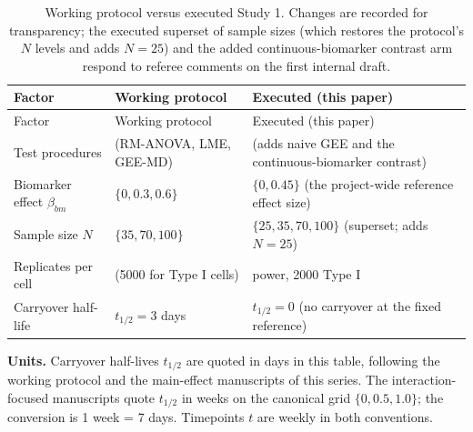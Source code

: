 \documentclass[
  11pt,
]{article}
\begin{document}
\begin{longtable}[]{@{}
  >{\raggedright\arraybackslash}p{}
  >{\raggedright\arraybackslash}p{}
  >{\raggedright\arraybackslash}p{}@{}}
\caption{\label{tab:deviations} Working protocol versus executed Study 1.
Changes are recorded for transparency; the executed superset
of sample sizes (which restores the protocol's \(N\) levels
and adds \(N = 25\)) and the added continuous-biomarker contrast
arm respond to referee comments on the first internal draft.}\tabularnewline
\toprule\noalign{}
\begin{minipage}[b]{\linewidth}\raggedright
Factor
\end{minipage} & \begin{minipage}[b]{\linewidth}\raggedright
Working protocol
\end{minipage} & \begin{minipage}[b]{\linewidth}\raggedright
Executed (this paper)
\end{minipage} \\
\midrule\noalign{}
\endfirsthead
\toprule\noalign{}
\begin{minipage}[b]{\linewidth}\raggedright
Factor
\end{minipage} & \begin{minipage}[b]{\linewidth}\raggedright
Working protocol
\end{minipage} & \begin{minipage}[b]{\linewidth}\raggedright
Executed (this paper)
\end{minipage} \\
\midrule\noalign{}
\endhead
\bottomrule\noalign{}
\endlastfoot
Test procedures & 3 (RM-ANOVA, LME, GEE-MD) & 5 (adds naive GEE and the continuous-biomarker contrast) \\
Biomarker effect \(\beta_{bm}\) & \(\{0, 0.3, 0.6\}\) & \(\{0, 0.45\}\) (the project-wide reference effect size) \\
Sample size \(N\) & \(\{35, 70, 100\}\) & \(\{25, 35, 70, 100\}\) (superset; adds \(N = 25\)) \\
Replicates per cell & 1000 (5000 for Type I cells) & 1000 power, 2000 Type I \\
Carryover half-life & \(t_{1/2} = 3\) days & \(t_{1/2} = 0\) (no carryover at the fixed reference) \\
\end{longtable}

\textbf{Units.} Carryover half-lives \(t_{1/2}\) are quoted in days in this
table, following the working protocol and the main-effect manuscripts
of this series. The interaction-focused manuscripts quote \(t_{1/2}\) in
weeks on the canonical grid \(\{0, 0.5, 1.0\}\); the conversion is
1 week = 7 days. Timepoints \(t\) are weekly in both conventions.
\end{document}
